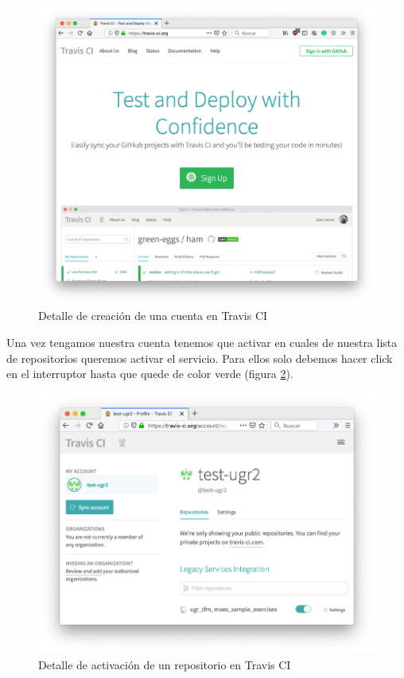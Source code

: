 \begin{figure}[H]
\centering
\includegraphics[width=1.0\textwidth]{../images/travis_signup}
\caption{Detalle de creación de una cuenta en Travis CI}
\label{fig:travis_signup}
\end{figure}

Una vez tengamos nuestra cuenta tenemos que activar en cuales de nuestra lista de repositorios queremos activar el servicio. Para ellos solo debemos hacer click en el interruptor hasta que quede de color verde (figura \ref{fig:travis_enable}).

\begin{figure}[H]
\centering
\includegraphics[width=1.0\textwidth]{../images/travis_enable}
\caption{Detalle de activación de un repositorio en Travis CI}
\label{fig:travis_enable}
\end{figure}

